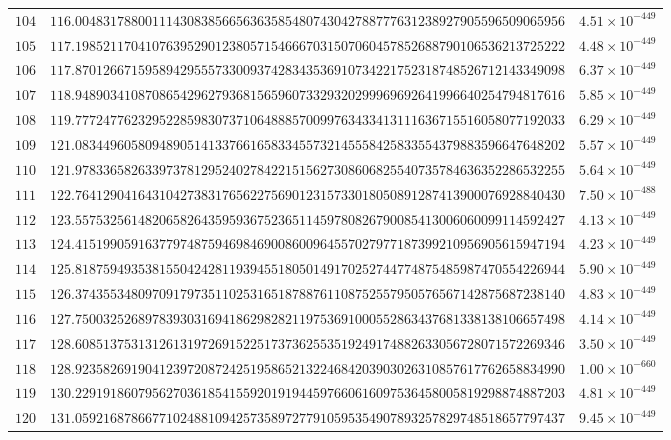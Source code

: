 \documentclass[12pt,reqno]{amsart}
\theoremstyle{remark}
\begin{document}
\begin{longtable}{clc}
$104$ & $116.0048317880011143083856656363585480743042788777631238927905596509065956$ & $4.51\times 10^{-449}$ \\
$105$ & $117.1985211704107639529012380571546667031507060457852688790106536213725222$ & $4.48\times 10^{-449}$ \\
$106$ & $117.8701266715958942955573300937428343536910734221752318748526712143349098$ & $6.37\times 10^{-449}$ \\
$107$ & $118.9489034108708654296279368156596073329320299969692641996640254794817616$ & $5.85\times 10^{-449}$ \\
$108$ & $119.7772477623295228598307371064888570099763433413111636715516058077192033$ & $6.29\times 10^{-449}$ \\
$109$ & $121.0834496058094890514133766165833455732145558425833554379883596647648202$ & $5.57\times 10^{-449}$ \\
$110$ & $121.9783365826339737812952402784221515627308606825540735784636352286532255$ & $5.64\times 10^{-449}$ \\
$111$ & $122.7641290416431042738317656227569012315733018050891287413900076928840430$ & $7.50\times 10^{-488}$ \\
$112$ & $123.5575325614820658264359593675236511459780826790085413006060099114592427$ & $4.13\times 10^{-449}$ \\
$113$ & $124.4151990591637797487594698469008600964557027977187399210956905615947194$ & $4.23\times 10^{-449}$ \\
$114$ & $125.8187594935381550424281193945518050149170252744774875485987470554226944$ & $5.90\times 10^{-449}$ \\
$115$ & $126.3743553480970917973511025316518788761108752557950576567142875687238140$ & $4.83\times 10^{-449}$ \\
$116$ & $127.7500325268978393031694186298282119753691000552863437681338138106657498$ & $4.14\times 10^{-449}$ \\
$117$ & $128.6085137531312613197269152251737362553519249174882633056728071572269346$ & $3.50\times 10^{-449}$ \\
$118$ & $128.9235826919041239720872425195865213224684203903026310857617762658834990$ & $1.00\times 10^{-660}$ \\
$119$ & $130.2291918607956270361854155920191944597660616097536458005819298874887203$ & $4.81\times 10^{-449}$ \\
$120$ & $131.0592168786677102488109425735897277910595354907893257829748518657797437$ & $9.45\times 10^{-449}$ \\

\end{longtable}
\end{document}
